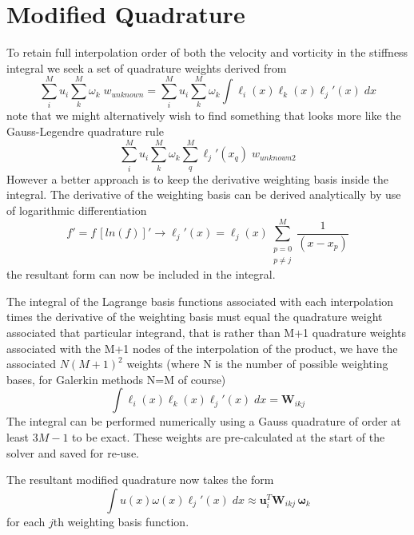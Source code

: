 \documentclass[letterpaper,12pt]{report}
\newcommand{\be}{\begin{equation}}
\newcommand{\ben}[1]{\begin{equation}\label{#1}}
\newcommand{\ee}{\end{equation}}
\begin{document}
\section{Modified Quadrature}\label{ModQuad}
To retain full interpolation order of both the velocity and vorticity in the stiffness integral we seek a set of quadrature weights derived from
\be \sum_i^M u_i \sum_k^M \omega_k \;w_{unknown} = \sum_i^M u_i \sum_k^M \omega_k \int \ell_i(x) \ell_k(x) \ell_j'(x) \;dx \ee
note that we might alternatively wish to find something that looks more like the Gauss-Legendre quadrature rule
\be \sum_i^M u_i \sum_k^M \omega_k \sum_q^M \ell_j'(x_q) \;w_{unknown2} \ee
However a better approach is to keep the derivative weighting basis inside the integral.
The derivative of the weighting basis can be derived analytically by use of logarithmic differentiation
\be f' = f \, [ln(f)]' \rightarrow \ell_j'(x)=\ell_j(x) \sum_{\substack{p=0\\ p\neq j}}^M \frac{1}{(x-x_p)} \ee
the resultant form can now be included in the integral.

The integral of the Lagrange basis functions associated with each interpolation times the derivative of the weighting basis must equal the quadrature weight associated that particular integrand, that is rather than M+1  quadrature weights associated with the M+1 nodes of the interpolation of the product, we have the associated $N(M+1)^2$ weights (where N is the number of possible weighting bases, for Galerkin methods N=M of course)
\be \int \ell_i(x) \ell_k(x) \ell_j'(x) \;dx = \mathbf{W}_{ikj} \ee
The integral can be performed numerically using a Gauss quadrature of order at least $3M-1$ to be exact. These weights are pre-calculated at the start of the solver and saved for re-use.

The resultant modified quadrature now takes the form
\ben{modQuad} \int u(x) \omega(x) \ell_j'(x) \;dx \approx \mathbf{u}_i^T \mathbf{W}_{ikj} \, \boldsymbol{\omega}_k \ee
for each $j$th weighting basis function.
\end{document}
